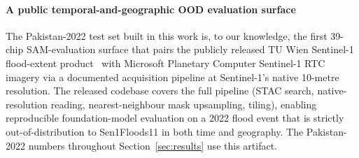 \documentclass[conference]{IEEEtran}
\begin{document}
\paragraph{A public temporal-and-geographic OOD evaluation surface}
The Pakistan-2022 test set built in this work is, to our knowledge, the first 39-chip SAM-evaluation surface that pairs the publicly released TU Wien Sentinel-1 flood-extent product~\cite{Roth2023Pakistan} with Microsoft Planetary Computer Sentinel-1 RTC imagery via a documented acquisition pipeline at Sentinel-1's native 10-metre resolution. The released codebase covers the full pipeline (STAC search, native-resolution reading, nearest-neighbour mask upsampling, tiling), enabling reproducible foundation-model evaluation on a 2022 flood event that is strictly out-of-distribution to Sen1Floods11 in both time and geography. The Pakistan-2022 numbers throughout Section~\ref{sec:results} use this artifact.
\end{document}
